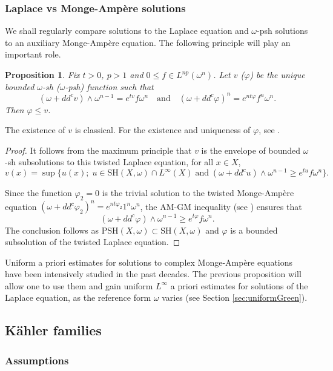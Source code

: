 \documentclass[10pt]{amsart}
\newtheorem{prop}[theorem]{Proposition}
\theoremstyle{definition}
\let\f\varphi
\newcommand \PSH {\mathrm{PSH}}
\newcommand \SH {\mathrm{SH}}
\let\Subsection\subsection\let\Subsubsection\subsubsection
\begin{document}
\subsubsection{Laplace vs Monge-Ampère solutions} \label{sec:LaplacevsMA}

We shall regularly compare solutions to the Laplace equation
and $\omega$-psh solutions to an auxiliary Monge-Ampère equation.
The following principle will play an important role.

\begin{prop} \label{pro:comparisonLMA}
Fix $t>0$, $p>1$ and $0 \leq f \in L^{np}(\omega^n)$. Let $v$ (\resp $\f$) be the unique bounded $\omega$-sh (\resp $\omega$-psh)
function such that
\[
(\omega+dd^c v) \wedge \omega^{n-1}=e^{tv} f \omega^n
\quad \text{and} \quad
(\omega+dd^c \f)^n = e^{nt\f} f^n \omega^n.
\]
Then $\f \leq v$.
\end{prop}

The existence of $v$ is classical.
For the existence and uniqueness of $\f$, see \cite{GZbook}.

\begin{proof}
It follows from the maximum principle that $v$ is the envelope of bounded $\omega$-sh subsolutions to this twisted Laplace equation, \ie for all $x \in X$,
\[
v(x)=\sup \bigl\{ u(x); \; u \in \SH(X,\omega) \cap L^{\infty}(X)
\; \text{and} \;
(\omega+dd^c u) \wedge \omega^{n-1} \geq e^{tu} f \omega^n \bigr\}.
\]

Since the function $\f_2=0$ is the trivial solution to the twisted Monge-Ampère equation
$(\omega+dd^c \f_2)^n = e^{nt\f_2} 1^n \omega^n$,
the AM-GM inequality (see \cite[Th.\,2.12]{DK14}) ensures that
\[
(\omega+dd^c \f) \wedge \omega^{n-1} \geq e^{t \f} f \omega^n.
\]
The conclusion follows as $\PSH(X,\omega) \subset \SH(X,\omega)$
and $\f$ is a bounded subsolution of the twisted Laplace equation.
\end{proof}

Uniform a priori estimates for solutions to complex Monge-Ampère equations
have been intensively studied in the past decades. The previous proposition
will allow one to use them and gain uniform $L^{\infty}$ a priori estimates
for solutions of the Laplace equation, as the reference form $\omega$ varies
(see Section \ref{sec:uniformGreen}).

\Subsection{Kähler families} \label{sec:uniformMA}

\subsubsection{Assumptions}
\end{document}
